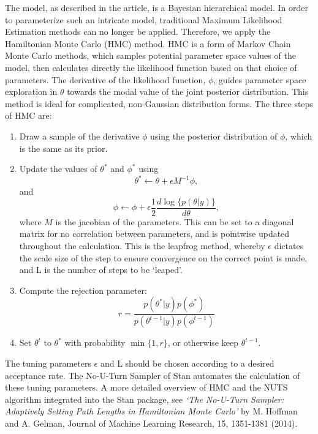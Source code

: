 \documentclass[
]{article}
\begin{document}
The model, as described in the article, is a Bayesian hierarchical model. In order to parameterize such an intricate model, traditional Maximum Likelihood Estimation methods can no longer be applied. Therefore, we apply the Hamiltonian Monte Carlo (HMC) method. HMC is a form of Markov Chain Monte Carlo methods, which samples potential parameter space values of the model, then calculates directly the likelihood function based on that choice of parameters. The derivative of the likelihood function, \(\phi\), guides parameter space exploration in \(\theta\) towards the modal value of the joint posterior distribution. This method is ideal for complicated, non-Gaussian distribution forms. The three steps of HMC are:

\begin{enumerate}
\item Draw a sample of the derivative $\phi$ using the posterior distribution of $\phi$, which is the same as its prior.
\item Update the values of $\theta^*$ and $\phi^*$ using
  \begin{equation}
    \theta^*\leftarrow \theta+\epsilon M^{-1}\phi,
  \end{equation}
  and
  \begin{equation}
    \phi\leftarrow \phi+\epsilon\frac{1}{2}\frac{d\log\{p(\theta|y)\}}{d\theta},
  \end{equation}
where $M$ is the jacobian of the parameters. This can be set to a diagonal matrix for no correlation between parameters, and is pointwise updated throughout the calculation. This is the leapfrog method, whereby $\epsilon$ dictates the scale size of the step to ensure convergence on the correct point is made, and L is the number of steps to be `leaped'.
\item Compute the rejection parameter:
  \begin{equation}
    r=\frac{p(\theta^*|y)p(\phi^*)}{p(\theta^{t-1}|y)p(\phi^{t-1})}
  \end{equation}
\item Set $\theta^t$ to $\theta^*$ with probability $\min\{1,r\}$, or otherwise keep $\theta^{t-1}$.
\end{enumerate}

The tuning parameters \(\epsilon\) and L should be chosen according to a desired acceptance rate. The No-U-Turn Sampler of Stan automates the calculation of these tuning parameters. A more detailed overview of HMC and the NUTS algorithm integrated into the Stan package, see \emph{`The No-U-Turn Sampler: Adaptively Setting Path Lengths
in Hamiltonian Monte Carlo'} by M. Hoffman and A. Gelman, Journal of Machine Learning Research, 15, 1351-1381 (2014).
\end{document}
